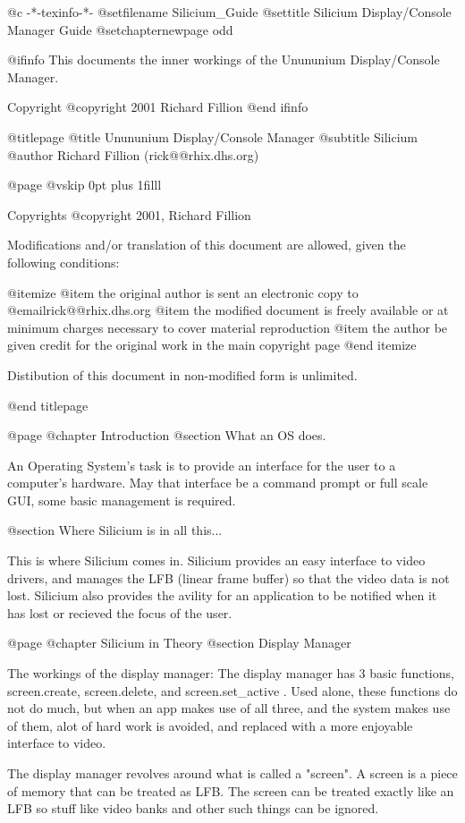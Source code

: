  @c -*-texinfo-*-
@setfilename Silicium_Guide
@settitle Silicium Display/Console Manager Guide
@setchapternewpage odd

@ifinfo
This documents the inner workings of the Unununium Display/Console Manager.

Copyright @copyright{} 2001 Richard Fillion
@end ifinfo

@titlepage
@title Unununium Display/Console Manager
@subtitle Silicium
@author Richard Fillion (rick@@rhix.dhs.org)

@page
@vskip 0pt plus 1filll

Copyrights @copyright{} 2001, Richard Fillion

Modifications and/or translation of this document are allowed, given the
following conditions:

@itemize
@item the original author is sent an electronic copy to @email{rick@@rhix.dhs.org}
@item the modified document is freely available or at minimum charges necessary
to cover material reproduction
@item the author be given credit for the original work in the main copyright page
@end itemize

Distibution of this document in non-modified form is unlimited.

@end titlepage

@page
@chapter Introduction
@section What an OS does.

An Operating System's task is to provide an interface for the user to a computer's hardware.  May that interface be a command prompt or full scale GUI, some basic management is required.

@section Where Silicium is in all this...

This is where Silicium comes in.  Silicium provides an easy interface to video drivers, and manages the LFB (linear frame buffer) so that the video data is not
lost.  Silicium also provides the avility for an application to be notified when it has lost or recieved the focus of the user.

@page
@chapter Silicium in Theory
@section Display Manager

The workings of the display manager:
The display manager has 3 basic functions, screen.create, screen.delete, and screen.set_active .  Used alone, these functions do not do much, but when an app makes use of all three, and the system makes use of them, alot of hard work is avoided, and replaced with a more enjoyable interface to video.

The display manager revolves around what is called a "screen".  A screen is a piece of memory that can be treated as LFB.  The screen can be treated exactly like an LFB so stuff like video banks and other such things can be ignored.

